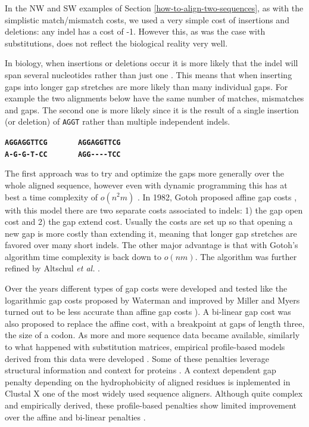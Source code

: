 \documentclass[
  11pt,
  twoside]{scrbook}
\begin{document}
In the NW and SW examples of Section \ref{how-to-align-two-sequences}, as with the simplistic match/mismatch costs, we used a very simple cost of insertions and deletions: any indel has a cost of -1. However this, as was the case with substitutions, does not reflect the biological reality very well.

In biology, when insertions or deletions occur it is more likely that the indel will span several nucleotides rather than just one \autocite{cartwrightProblemsSolutionsEstimating2009}. This means that when inserting gaps into longer gap stretches are more likely than many individual gaps. For example the two alignments below have the same number of matches, mismatches and gaps. The second one is more likely since it is the result of a single insertion (or deletion) of \texttt{AGGT} rather than multiple independent indels.

\textbf{\texttt{AGGAGGTTCG}} ~~~~~~ \textbf{\texttt{AGGAGGTTCG}}\\
\textbf{\texttt{A-G-G-T-CC}} ~~~~~~ \textbf{\texttt{AGG-\/-\/-\/-TCC}}

The first approach was to try and optimize the gaps more generally \autocite{fitchOptimalSequenceAlignments1983} over the whole aligned sequence, however even with dynamic programming this has at best a time complexity of \(o(n^2m)\) \autocite{watermanBiologicalSequenceMetrics1976}. In 1982, Gotoh proposed affine gap costs \autocite{gotohImprovedAlgorithmMatching1982}, with this model there are two separate costs associated to indels: 1) the gap open cost and 2) the gap extend cost. Usually the costs are set up so that opening a new gap is more costly than extending it, meaning that longer gap stretches are favored over many short indels. The other major advantage is that with Gotoh's algorithm time complexity is back down to \(o(nm)\). The algorithm was further refined by Altschul \emph{et al.} \autocite{altschulOptimalSequenceAlignment1986}.

Over the years different types of gap costs were developed and tested like the logarithmic gap costs proposed by Waterman \autocite{watermanEfficientSequenceAlignment1984} and improved by Miller and Myers \autocite{millerSequenceComparisonConcave1988} turned out to be less accurate than affine gap costs \autocite{cartwrightLogarithmicGapCosts2006}). A bi-linear gap cost was also proposed to replace the affine cost\autocite{goonesekereFrequencyGapsObserved2004}, with a breakpoint at gaps of length three, the size of a codon. As more and more sequence data became available, similarly to what happened with substitution matrices, empirical profile-based models derived from this data were developed \autocite{bennerEmpiricalStructuralModels1993}. Some of these penalties leverage structural information and context for proteins \autocite{wrablGapsStructurallySimilar2004,zhangSP5ImprovingProtein2008}. A context dependent gap penalty depending on the hydrophobicity of aligned residues is inplemented in Clustal X \autocite{jeanmouginMultipleSequenceAlignment1998} one of the most widely used sequence aligners. Although quite complex and empirically derived, these profile-based penalties show limited improvement over the affine and bi-linear penalties \autocite{wangComparisonLinearGap2011}.
\end{document}
